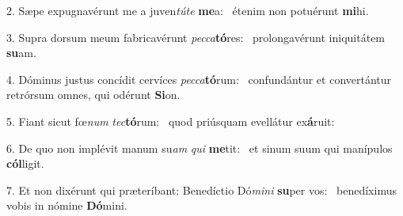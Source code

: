 2. Sæpe expugnavérunt me a juven\textit{tú}\textit{te} \textbf{me}a: \ast\  étenim non potuérunt \textbf{mi}hi.\

3. Supra dorsum meum fabricavérunt \textit{pec}\textit{ca}\textbf{tó}res: \ast\  prolongavérunt iniquitátem \textbf{su}am.\

4. Dóminus justus concídit cervíces \textit{pec}\textit{ca}\textbf{tó}rum: \ast\  confundántur et convertántur retrórsum omnes, qui odérunt \textbf{Si}on.\

5. Fiant sicut fœ\textit{num} \textit{tec}\textbf{tó}rum: \ast\  quod priúsquam evellátur ex\textbf{á}ruit:\

6. De quo non implévit manum su\textit{am} \textit{qui} \textbf{me}tit: \ast\  et sinum suum qui manípulos \textbf{cól}ligit.\

7. Et non dixérunt qui præteríbant: Benedíctio Dó\textit{mi}\textit{ni} \textbf{su}per vos: \ast\  benedíximus vobis in nómine \textbf{Dó}mini.\


